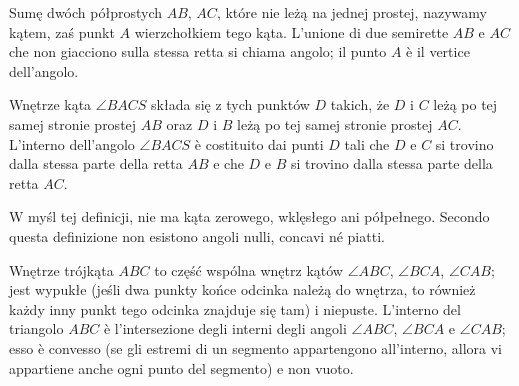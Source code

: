 \begin{definition}
[kąt] %
[angolo] %
    Sumę dwóch półprostych $AB$, $AC$, które nie leżą na jednej prostej, nazywamy kątem, zaś punkt $A$ wierzchołkiem tego kąta. %
    L'unione di due semirette $AB$ e $AC$ che non giacciono sulla stessa retta si chiama angolo; il punto $A$ è il vertice dell'angolo. %

    Wnętrze kąta $\angle BACS$ składa się z tych punktów $D$ takich, że $D$ i $C$ leżą po tej samej stronie prostej $AB$ oraz $D$ i $B$ leżą po tej samej stronie prostej $AC$. %
    L'interno dell'angolo $\angle BACS$ è costituito dai punti $D$ tali che $D$ e $C$ si trovino dalla stessa parte della retta $AB$ e che $D$ e $B$ si trovino dalla stessa parte della retta $AC$. %

\end{definition} %

W myśl tej definicji, nie ma kąta zerowego, wklęsłego ani półpełnego. %
Secondo questa definizione non esistono angoli nulli, concavi né piatti. %




Wnętrze trójkąta $ABC$ to część wspólna wnętrz kątów $\angle ABC$, $\angle BCA$, $\angle CAB$; jest wypukłe (jeśli dwa punkty końce odcinka należą do wnętrza, to również każdy inny punkt tego odcinka znajduje się tam) i niepuste. %
L'interno del triangolo $ABC$ è l'intersezione degli interni degli angoli $\angle ABC$, $\angle BCA$ e $\angle CAB$; esso è convesso (se gli estremi di un segmento appartengono all'interno, allora vi appartiene anche ogni punto del segmento) e non vuoto. %

%